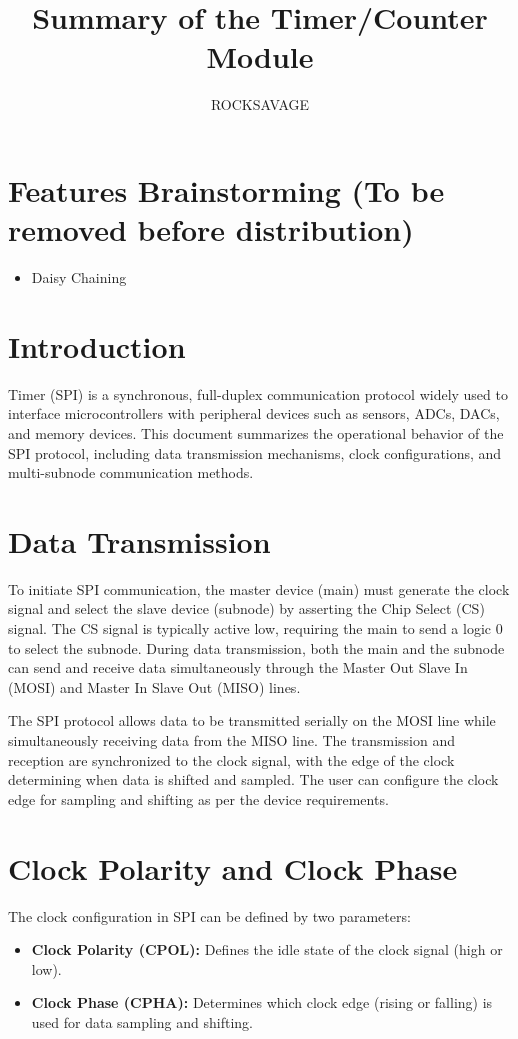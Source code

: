 \documentclass{article}
\title{Summary of the Timer/Counter Module}
\author{ROCKSAVAGE}
\date{}
\begin{document}
\maketitle

\section{Features Brainstorming (To be removed before distribution)}
\begin{itemize}
    \item Daisy Chaining
\end{itemize}

\section{Introduction}
Timer (SPI) is a synchronous, full-duplex communication protocol widely used to interface microcontrollers with peripheral devices such as sensors, ADCs, DACs, and memory devices. This document summarizes the operational behavior of the SPI protocol, including data transmission mechanisms, clock configurations, and multi-subnode communication methods.

\section{Data Transmission}
To initiate SPI communication, the master device (main) must generate the clock signal and select the slave device (subnode) by asserting the Chip Select (CS) signal. The CS signal is typically active low, requiring the main to send a logic 0 to select the subnode. During data transmission, both the main and the subnode can send and receive data simultaneously through the Master Out Slave In (MOSI) and Master In Slave Out (MISO) lines.

The SPI protocol allows data to be transmitted serially on the MOSI line while simultaneously receiving data from the MISO line. The transmission and reception are synchronized to the clock signal, with the edge of the clock determining when data is shifted and sampled. The user can configure the clock edge for sampling and shifting as per the device requirements.

\section{Clock Polarity and Clock Phase}
The clock configuration in SPI can be defined by two parameters:
\begin{itemize}
    \item \textbf{Clock Polarity (CPOL):} Defines the idle state of the clock signal (high or low).
    \item \textbf{Clock Phase (CPHA):} Determines which clock edge (rising or falling) is used for data sampling and shifting.
\end{itemize}
\end{document}
